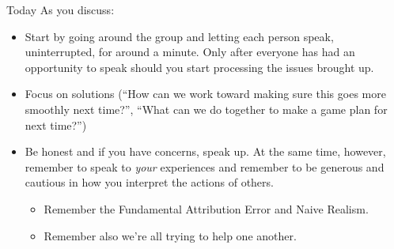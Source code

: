 \documentclass[11pt]{beamer}
\begin{document}
\begin{frame}[c]{Today}
As you discuss:
\begin{itemize}
    \item Start by going around the group and letting each person speak, \alert{uninterrupted}, for around a minute. Only after everyone has had an opportunity to speak should you start processing the issues brought up.
    \item Focus on solutions (``How can we work toward making sure this goes more smoothly next time?'', ``What can we do together to make a game plan for next time?'')
    \item Be honest and if you have concerns, speak up. At the same time, however, remember to speak to \emph{your} experiences and remember to be \alert{generous and cautious} in how you interpret the actions of others.
        \begin{itemize}
            \item Remember the Fundamental Attribution Error and Naive Realism. 
            \item Remember also we're all trying to help one another.
        \end{itemize}
\end{itemize}
\end{frame}
\end{document}
